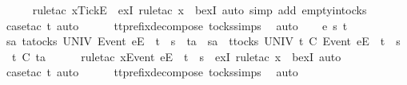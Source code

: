 \ \ \ \ \isamarkupfalse%
\ {\isacharparenleft}rule{\isacharunderscore}tac\ x{\isacharequal}{\isachardoublequoteopen}{\isacharbrackleft}{\isacharbrackleft}Tick{\isacharbrackright}\isactrlsub E{\isacharbrackright}{\isachardoublequoteclose}\ \ exI{\isacharcomma}\ rule{\isacharunderscore}tac\ x{\isacharequal}{\isachardoublequoteopen}{\isacharbrackleft}{\isacharbrackright}{\isachardoublequoteclose}\ \ bexI{\isacharcomma}\ auto\ simp\ add{\isacharcolon}\ empty{\isacharunderscore}in{\isacharunderscore}tocks{\isacharparenright}\isanewline
\ \ \ \ \isamarkupfalse%
\ {\isacharparenleft}case{\isacharunderscore}tac\ t{\isacharprime}{\isacharcomma}\ auto{\isacharparenright}\isanewline
\ \ \ \ \isamarkupfalse%
\ tt{\isacharunderscore}prefix{\isacharunderscore}decompose\ tocks{\isachardot}simps\ \isamarkupfalse%
\ auto\isanewline
{}\isamarkupfalse%
\isanewline
\ \ \isamarkupfalse%
\ e\ s\ t\isanewline
\ \ \isamarkupfalse%
\ {\isachardoublequoteopen}{\isasymexists}sa{\isachardot}\ {\isasymexists}ta{\isasymin}tocks\ UNIV{\isachardot}\ {\isacharbrackleft}Event\ e{\isacharbrackright}\isactrlsub E\ {\isacharhash}\ t\ {\isacharat}\ s\ {\isacharequal}\ ta\ {\isacharat}\ sa\ {\isasymand}\ {\isacharparenleft}{\isasymforall}t{\isacharprime}{\isasymin}tocks\ UNIV{\isachardot}\ t{\isacharprime}\ {\isasymle}\isactrlsub C\ {\isacharbrackleft}Event\ e{\isacharbrackright}\isactrlsub E\ {\isacharhash}\ t\ {\isacharat}\ s\ {\isasymlongrightarrow}\ t{\isacharprime}\ {\isasymle}\isactrlsub C\ ta{\isacharparenright}{\isachardoublequoteclose}\isanewline
\ \ \ \ \isamarkupfalse%
\ {\isacharparenleft}rule{\isacharunderscore}tac\ x{\isacharequal}{\isachardoublequoteopen}{\isacharbrackleft}Event\ e{\isacharbrackright}\isactrlsub E\ {\isacharhash}\ t\ {\isacharat}\ s{\isachardoublequoteclose}\ \ exI{\isacharcomma}\ rule{\isacharunderscore}tac\ x{\isacharequal}{\isachardoublequoteopen}{\isacharbrackleft}{\isacharbrackright}{\isachardoublequoteclose}\ \ bexI{\isacharcomma}\ auto{\isacharparenright}\isanewline
\ \ \ \ \isamarkupfalse%
\ {\isacharparenleft}case{\isacharunderscore}tac\ t{\isacharprime}{\isacharcomma}\ auto{\isacharparenright}\isanewline
\ \ \ \ \isamarkupfalse%
\ tt{\isacharunderscore}prefix{\isacharunderscore}decompose\ tocks{\isachardot}simps\ \isamarkupfalse%
\ auto\isanewline
{}\isamarkupfalse%
\isanewline
\ \ \isamarkupfalse%
